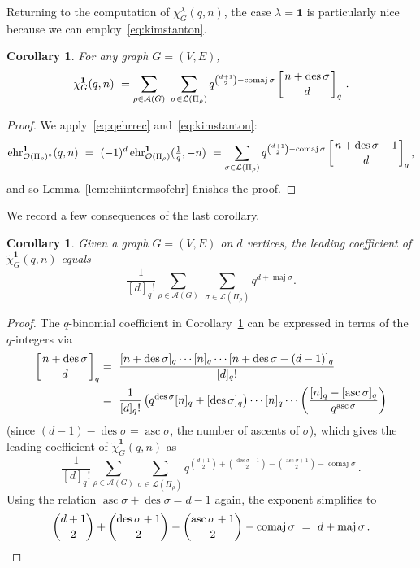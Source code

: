 \documentclass[11pt]{amsart}
\newtheorem{corollary}[theorem]{Corollary}
\newcommand\ehr{\operatorname{ehr}}
\newcommand\des{\operatorname{des}}
\newcommand\asc{\operatorname{asc}}
\newcommand\maj{\operatorname{maj}}
\newcommand\comaj{\operatorname{comaj}}
\newcommand\bone{\mathbf{1}}
\begin{document}
Returning to the computation of $\chi^\lambda_G(q,n)$, the case $\lambda=\bone$ is particularly nice because we can employ~\eqref{eq:kimstanton}.

\begin{corollary}\label{cor:chibyqbinomials}
For any graph $G=(V,E)$,
\[
\chi^\bone_G(q,n) \ = \sum_{\rho\in \mathcal{A}(G)} \ \sum_{\sigma\in \mathcal{L}(\Pi_\rho)}q^{\binom{d+1}{2}-\comaj{\sigma}}\left[ n+\des{\sigma} \atop d \right]_q \, . 
\]
\end{corollary} 

\begin{proof} 
We apply~\eqref{eq:qehrrec} and~\eqref{eq:kimstanton}: 
\[
\ehr^\bone_{\mathcal{O}(\Pi_\rho)^\circ}(q,n)
  \ = \ (-1)^d\ehr^\bone_{\mathcal{O}(\Pi_\rho)}(\tfrac 1q,-n)
  \ = \sum_{\sigma\in \mathcal{L}(\Pi_\rho)}q^{\binom{d+1}{2}-\comaj{\sigma}}\left[ n+\des{\sigma}-1 \atop d\right]_q,
\]
and so Lemma~\ref{lem:chiintermsofehr} finishes the proof. 
\end{proof}

We record a few consequences of the last corollary.

\begin{corollary}\label{cor:chibyqbinomialsleadingcoeff}
Given a graph $G=(V,E)$ on $d$ vertices, the leading coefficient of $\widetilde\chi^\bone_G(q,n)$ equals
\[
  \frac{1}{[d]_q!} \sum_{\rho\in \mathcal{A}(G)} \ \sum_{\sigma\in \mathcal{L}(\Pi_\rho)} q^{d+\maj{\sigma}} . 
\]
\end{corollary}

\begin{proof}
The $q$-binomial coefficient in Corollary~\ref{cor:chibyqbinomials}
can be expressed in terms of the $q$-integers via
\begin{align*}
\left[ n+\des{\sigma} \atop d\right]_q&= \ \frac{[n+\des{\sigma}]_q\cdots[n]_q\cdots[n+\des{\sigma}-(d-1)]_q}{[d]_q!}\\
&= \ \frac{1}{[d]_q!} \left(q^{\des{\sigma}} [n]_q+[\des{\sigma}]_q \right) \cdots[n]_q\cdots\left(\frac{[n]_q-[\asc{\sigma}]_q}{q^{\asc{\sigma}}}\right)
\end{align*}
(since $(d-1)-\des{\sigma}=\asc{\sigma}$, the number of ascents of $\sigma$), which gives the
leading coefficient of $\widetilde\chi^\bone_G(q,n)$ as
\[
  \frac{1}{[d]_q!}\sum_{\rho\in \mathcal{A}(G)}\sum_{\sigma\in\mathcal{L}(\Pi_\rho)}q^{\binom{d+1}{2}+\binom{\des{\sigma}+1}{2}-\binom{\asc{\sigma}+1}{2}-\comaj{\sigma}} \, .
\]
Using the relation $\asc \sigma + \des \sigma = d-1$ again, the exponent simplifies to
\[
\binom{d+1}{2}+\binom{\des{\sigma}+1}{2}-\binom{\asc{\sigma}+1}{2}-\comaj{\sigma}
\ = \ d+\maj{\sigma} \, . \qedhere
\]
\end{proof}
\end{document}
